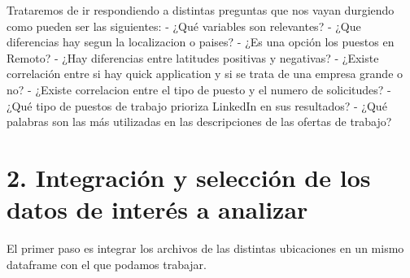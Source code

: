 \documentclass[
]{article}
\begin{document}
Trataremos de ir respondiendo a distintas preguntas que nos vayan
durgiendo como pueden ser las siguientes: - ¿Qué variables son
relevantes? - ¿Que diferencias hay segun la localizacion o paises? - ¿Es
una opción los puestos en Remoto? - ¿Hay diferencias entre latitudes
positivas y negativas? - ¿Existe correlación entre si hay quick
application y si se trata de una empresa grande o no? - ¿Existe
correlacion entre el tipo de puesto y el numero de solicitudes? - ¿Qué
tipo de puestos de trabajo prioriza LinkedIn en sus resultados? - ¿Qué
palabras son las más utilizadas en las descripciones de las ofertas de
trabajo?

\hypertarget{integracion-y-seleccion-de-los-datos-de-interes-a-analizar}{%
\section{2. Integración y selección de los datos de interés a
analizar}\label{integracion-y-seleccion-de-los-datos-de-interes-a-analizar}}

El primer paso es integrar los archivos de las distintas ubicaciones en
un mismo dataframe con el que podamos trabajar.
\end{document}
